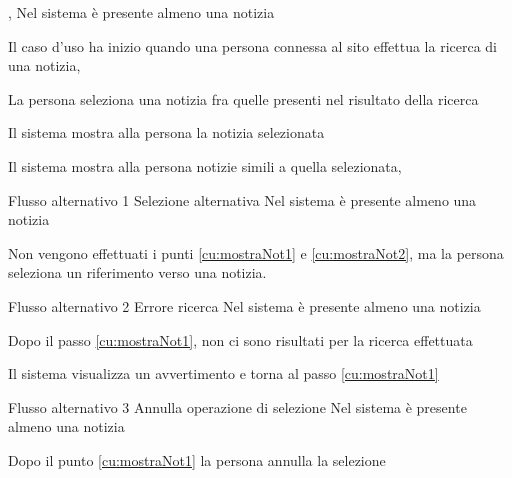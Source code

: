 
%

\tabcuvspace

{, }
{Nel sistema è presente almeno una notizia}
{\postNulle}
{\begin{enumCU}
	\item Il caso d'uso ha inizio quando una persona connessa al sito effettua la ricerca di una notizia, \label{cu:mostraNot1}
	\item La persona seleziona una notizia fra quelle presenti nel risultato della ricerca\label{cu:mostraNot2}
	\item Il sistema mostra alla persona la notizia selezionata
	\item Il sistema mostra alla persona notizie simili a quella selezionata, 
\end{enumCU}}
%
{Flusso alternativo 1}%
{Selezione alternativa}%
{Nel sistema è presente almeno una notizia}%
{\postNulle}%
{\begin{enumCU}
		\item Non vengono effettuati i punti \ref{cu:mostraNot1} e \ref{cu:mostraNot2}, ma la persona seleziona un \gls{riferimento} verso una notizia.
\end{enumCU}}%
%
{Flusso alternativo 2}%
{Errore ricerca}%
{Nel sistema è presente almeno una notizia}%
{\postNulle}%
{\begin{enumCU}
		\item Dopo il passo \ref{cu:mostraNot1}, non ci sono risultati per la ricerca effettuata
		\item Il sistema visualizza un avvertimento e torna al passo \ref{cu:mostraNot1}
\end{enumCU}}%
%	
{Flusso alternativo 3}%
{Annulla operazione di selezione}%
{Nel sistema è presente almeno una notizia}%
{\postNulle}%
{\begin{enumCU}
		\item Dopo il punto \ref{cu:mostraNot1} la persona annulla la selezione
\end{enumCU}}%

